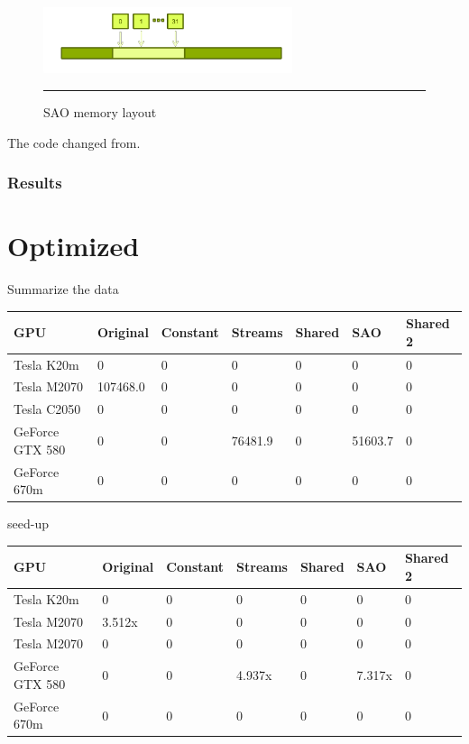 \begin{figure}[htbp]
	\centering
		\includegraphics[width=0.65\textwidth]{Figures/soa.png}
		\rule{35em}{0.2pt}
	\caption[Structure of Arrays (SAO)]{SAO memory layout}
	\label{fig:sao}
\end{figure}

The code changed from.

\subsubsection{Results}



\section{Optimized}



Summarize the data

\begin{table}[h]
\centering
  \begin{tabular} { |  l  |  l | l  |  l  | l | l | l |}
    \hline
    GPU & Original & Constant & Streams & Shared & SAO & Shared 2 \\
    \hline
    Tesla K20m & 0 & 0 & 0 & 0 & 0 & 0\\
   \hline
    Tesla M2070 & 107468.0 & 0 & 0 & 0 & 0 & 0\\
    \hline
    Tesla C2050 & 0 & 0 & 0 & 0 & 0 & 0\\
   \hline
    GeForce GTX 580 & 0 & 0 & 76481.9 & 0 & 51603.7 & 0\\
   \hline
    GeForce 670m & 0 & 0 & 0 & 0 & 0 & 0\\
   \hline
  \end{tabular}
  \end{table}
  
  
  seed-up
  \begin{table}[h]
\centering
  \begin{tabular} { |  l  |  l | l  |  l  | l | l | l |}
    \hline
    GPU & Original & Constant & Streams & Shared & SAO & Shared 2 \\
    \hline
    Tesla K20m & 0 & 0 & 0 & 0 & 0 & 0\\
   \hline
    Tesla M2070 & 3.512x & 0 & 0 & 0 & 0 & 0\\
    \hline
    Tesla M2070 & 0 & 0 & 0 & 0 & 0 & 0\\
   \hline
    GeForce GTX 580 & 0 & 0 & 4.937x & 0 & 7.317x & 0\\
   \hline
    GeForce 670m & 0 & 0 & 0 & 0 & 0 & 0\\
   \hline
  \end{tabular}
  \end{table}
  
